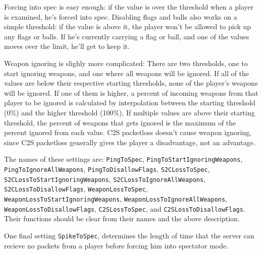 \documentclass{article}
\begin{document}
Forcing into spec is easy enough: if the value is over the threshold
when a player is examined, he's forced into spec. Disabling flags and
balls also works on a simple threshold: if the value is above it, the
player won't be allowed to pick up any flags or balls. If he's currently
carrying a flag or ball, and one of the values moves over the limit,
he'll get to keep it.

Weapon ignoring is slighly more complicated: There are two thresholds,
one to start ignoring weapons, and one where all weapons will be
ignored. If all of the values are below their respective starting
thresholds, none of the player's weapons will be ignored. If one of them
is higher, a percent of incoming weapons from that player to be ignored
is calculated by interpolation between the starting threshold (0\%) and
the higher threshold (100\%). If multiple values are above their
starting threshold, the percent of weapons that gets ignored is the
maximum of the percent ignored from each value. C2S packetloss doesn't
cause weapon ignoring, since C2S packetloss generally gives the player a
disadvantage, not an advantage.

The names of these settings are:
\texttt{PingToSpec},
\texttt{PingToStartIgnoringWeapons},
\texttt{PingToIgnoreAllWeapons},
\texttt{PingToDisallowFlags},
\texttt{S2CLossToSpec},
\texttt{S2CLossToStartIgnoringWeapons},
\texttt{S2CLossToIgnoreAllWeapons},
\texttt{S2CLossToDisallowFlags},
\texttt{WeaponLossToSpec},
\texttt{WeaponLossToStartIgnoringWeapons},
\texttt{WeaponLossToIgnoreAllWeapons},
\texttt{WeaponLossToDisallowFlags},
\texttt{C2SLossToSpec},
and
\texttt{C2SLossToDisallowFlags}. Their functions should be clear from
their names and the above description.

One final setting \texttt{SpikeToSpec}, determines the length of time that the server can
recieve no packets from a player before forcing him into spectator mode.


%
%
\end{document}
